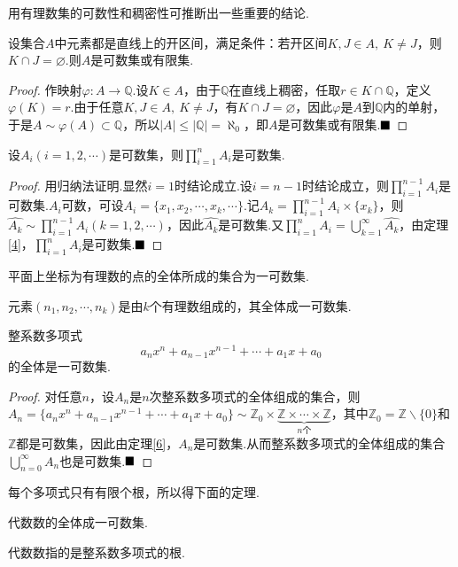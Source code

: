 用有理数集的可数性和稠密性可推断出一些重要的结论.
\begin{example}
	设集合$A$中元素都是直线上的开区间，满足条件：若开区间$K,J\in A,\ K\neq J$，则$K\cap J=\varnothing$.则$A$是可数集或有限集.
\end{example}
\begin{proof}
	作映射$\varphi:A\rightarrow\mathbb{Q}$.设$K\in A$，由于$\mathbb{Q}$在直线上稠密，任取$r\in K\cap \mathbb{Q}$，定义$\varphi(K)=r$.由于任意$K,J\in A,\ K\neq J$，有$K\cap J=\varnothing$，因此$\varphi$是$A$到$\mathbb{Q}$内的单射，于是$A\sim \varphi(A)\subset \mathbb{Q}$，所以$|A|\leqslant|\mathbb{Q}|=\aleph_0$，即$A$是可数集或有限集.$\hfill\blacksquare$
\end{proof}
\begin{theorem}\label{6}
	设$A_i(i=1,2,\cdots)$是可数集，则$\prod\limits_{i=1}^{n}A_i$是可数集.
\end{theorem}
\begin{proof}
	用归纳法证明.显然$i=1$时结论成立.设$i=n-1$时结论成立，则$\prod\limits_{i=1}^{n-1}A_i$是可数集.$A_i$可数，可设$A_i=\{x_1,x_2,\cdots,x_k,\cdots\}$.记$\hat{A_k}=\prod\limits_{i=1}^{n-1}A_i\times\{x_k\}$，则$\hat{A_k}\sim\prod\limits_{i=1}^{n-1}A_i(k=1,2,\cdots)$，因此$\hat{A_k}$是可数集.又$\prod\limits_{i=1}^{n}A_i=\bigcup\limits_{k=1}^{\infty}\hat{A_k}$，由定理\ref{4}，$\prod\limits_{i=1}^{n}A_i$是可数集.$\hfill\blacksquare$
\end{proof}
\begin{example}
	平面上坐标为有理数的点的全体所成的集合为一可数集.
\end{example}
\begin{example}
	元素$(n_1,n_2,\cdots,n_k)$是由$k$个有理数组成的，其全体成一可数集.
\end{example}
\begin{example}
	整系数多项式
	$$a_nx^n+a_{n-1}x^{n-1}+\cdots+a_1x+a_0$$
	的全体是一可数集.
\end{example}
\begin{proof}
	对任意$n$，设$A_n$是$n$次整系数多项式的全体组成的集合，则$A_n=\{a_nx^n+a_{n-1}x^{n-1}+\cdots+a_1x+a_0\}\sim\mathbb{Z}_0\times\underbrace{\mathbb{Z}\times\cdots\times\mathbb{Z}}_{n\text{个}}$，其中$\mathbb{Z}_0=\mathbb{Z}\backslash\{0\}$和$\mathbb{Z}$都是可数集，因此由定理\ref{6}，$A_n$是可数集.从而整系数多项式的全体组成的集合$\bigcup\limits_{n=0}^{\infty}A_n$也是可数集.$\hfill\blacksquare$
\end{proof}
每个多项式只有有限个根，所以得下面的定理.
\begin{theorem}
	代数数的全体成一可数集.
\end{theorem}
\begin{remark}
	代数数指的是整系数多项式的根.
\end{remark}

